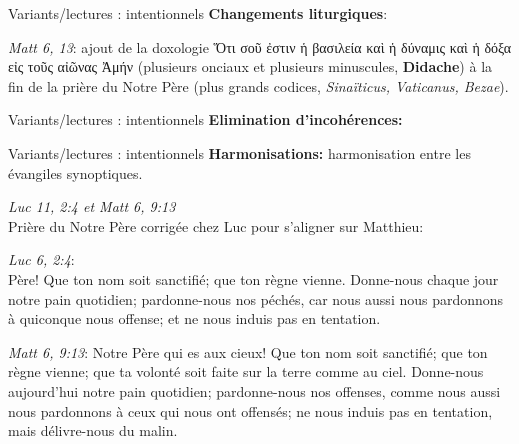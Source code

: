 \documentclass[11pt]{beamer}
\begin{document}
\begin{frame}{Variants/lectures : intentionnels}
    \textbf{Changements liturgiques}:\\
    \begin{block}{}
    \emph{Matt 6, 13}: ajout de la doxologie \textgreek{Ὅτι σοῦ ἐστιν ἡ βασιλεία καὶ ἡ δύναμις καὶ ἡ δόξα εἰς τοῦς αἰῶνας Ἀμήν} (plusieurs onciaux et plusieurs minuscules, \textbf{Didache}) à la fin de la prière du Notre Père (plus grands codices, \textit{Sinaïticus, Vaticanus, Bezae}).
    \end{block}
\end{frame}

\begin{frame}{Variants/lectures : intentionnels}
    \textbf{Elimination d'incohérences:}\\
\end{frame}

\begin{frame}{Variants/lectures : intentionnels}
    \textbf{Harmonisations:} harmonisation entre les évangiles synoptiques.\\

    \begin{block}{}
       \emph{Luc 11, 2:4 et Matt 6, 9:13} \\
       Prière du Notre Père corrigée chez Luc pour s'aligner sur Matthieu:\\
       
        \footnotesize
       \begin{minipage}{.45\textwidth}
           \emph{Luc 6, 2:4}:\\
Père! Que ton nom soit sanctifié; que ton règne vienne. Donne-nous chaque jour notre pain quotidien; pardonne-nous nos péchés, car nous aussi nous pardonnons à quiconque nous offense; et ne nous induis pas en tentation.
       \end{minipage}
       \hfill
        \begin{minipage}{.45\textwidth}
    \emph{Matt 6, 9:13}:
Notre Père qui es aux cieux! Que ton nom soit sanctifié; que ton règne vienne; que ta volonté soit faite sur la terre comme au ciel. Donne-nous aujourd'hui notre pain quotidien; pardonne-nous nos offenses, comme nous aussi nous pardonnons à ceux qui nous ont offensés; ne nous induis pas en tentation, mais délivre-nous du malin.
       \end{minipage}
    \end{block}
\end{frame}
\end{document}

